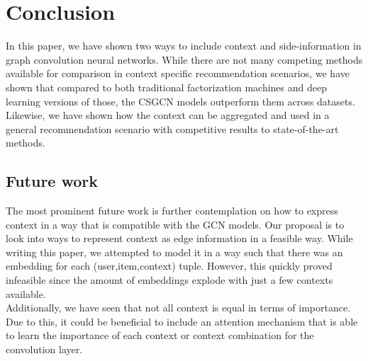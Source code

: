 \section{Conclusion}\label{sec:conclusion}
In this paper, we have shown two ways to include context and side-information in graph convolution neural networks.
While there are not many competing methods available for comparison in context specific recommendation scenarios, we have shown that compared to both traditional factorization machines and deep learning versions of those, the CSGCN models outperform them across datasets.
Likewise, we have shown how the context can be aggregated and used in a general recommendation scenario with competitive results to state-of-the-art methods.


\subsection{Future work}
The most prominent future work is further contemplation on how to express context in a way that is compatible with the GCN models.
Our proposal is to look into ways to represent context as edge information in a feasible way.
While writing this paper, we attempted to model it in a way such that there was an embedding for each (user,item,context) tuple.
However, this quickly proved infeasible since the amount of embeddings explode with just a few contexts available.
\\
Additionally, we have seen that not all context is equal in terms of importance.
Due to this, it could be beneficial to include an attention mechanism that is able to learn the importance of each context or context combination for the convolution layer.

